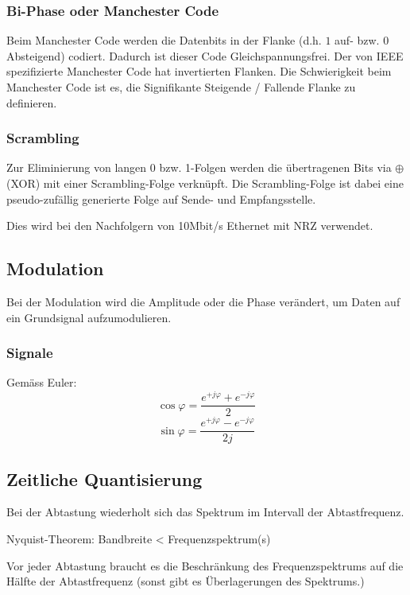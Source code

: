 \begin{multicols}{2}
\subsubsection{Bi-Phase oder Manchester Code}
	Beim Manchester Code werden die Datenbits in der Flanke (d.h. $1$ auf- bzw. $0$ Absteigend) codiert. Dadurch ist dieser Code Gleichspannungsfrei.
	Der von IEEE spezifizierte Manchester Code hat invertierten Flanken.
	Die Schwierigkeit beim Manchester Code ist es, die Signifikante Steigende / Fallende Flanke zu definieren.

	
\subsubsection{Scrambling}
	Zur Eliminierung von langen 0 bzw. 1-Folgen werden die übertragenen Bits via $\oplus$ (XOR) mit einer Scrambling-Folge verknüpft.
	Die Scrambling-Folge ist dabei eine pseudo-zufällig generierte Folge auf Sende- und Empfangsstelle.
	
	Dies wird bei den Nachfolgern von 10Mbit/s Ethernet mit NRZ verwendet.

\subsection{Modulation}
	
	Bei der Modulation wird die Amplitude oder die Phase verändert, um Daten auf ein Grundsignal aufzumodulieren.
	

\subsubsection{Signale}
	
	
	Gemäss Euler:
	\[
		\cos \varphi = \frac{
			e^{+j \varphi} + e^{-j \varphi}
		}{2}
	\]
	\[
		\sin \varphi = \frac{
			e^{+j \varphi} - e^{-j \varphi}
		}{2j}
	\]
	


\subsection{Zeitliche Quantisierung}

	Bei der Abtastung wiederholt sich das Spektrum im Intervall der Abtastfrequenz.
	
	Nyquist-Theorem: Bandbreite < Frequenzspektrum(s)
	
	Vor jeder Abtastung braucht es die Beschränkung des Frequenzspektrums auf die Hälfte der Abtastfrequenz (sonst gibt es Überlagerungen des Spektrums.)



\end{multicols}
